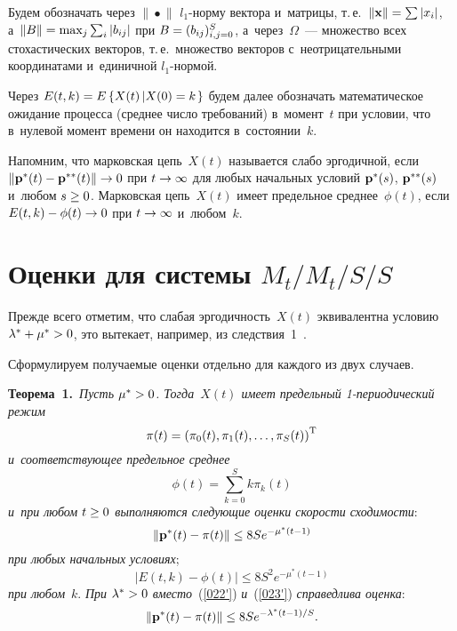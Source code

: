 \begin{multicols}{2}
Будем обозначать  через $\|\!\bullet\!\|$   $l_1$-нор\-му вектора 
и~мат\-ри\-цы, т.\,е.\  $\|{\bf x}\|\hm=\sum|x_i|$, 
а~$\|B\| \hm= \max\nolimits_j \sum\nolimits_i
|b_{ij}|$ при $B\hm = (b_{ij})_{i,j=0}^{S}$, а~через~$\Omega$~---
множество всех стохастических векторов, т.\,е.\ множество векторов 
с~неотрицательными координатами и~единичной $l_1$-нормой.


Через $E(t,k) = E\left\{X(t)\left\vert X(0)\hm=k\right.\right\}$ будем далее
обозначать математическое ожидание процесса (среднее число
требований) в~момент~$t$ при условии, что в~нулевой момент времени
он находится в~состоянии~$k$.

Напомним, что марковская цепь~$X(t)$ называется слабо эргодичной,
если $\| {\bf p^*}(t) \hm- {\bf p^{**}}(t) \| \hm\to 0 $ при $t\hm \to
\infty$ для любых начальных условий  ${\bf p^*}(s)$, ${\bf p^{**}}(s)$
и~любом $ s \hm\ge 0$. Марковская цепь~$X(t)$ имеет предельное среднее~$\phi (t)$, 
если $E(t,k) \hm- \phi (t) \hm\to 0$ при $t \hm\to \infty$ и~любом~$k$.

\section{Оценки для системы $M_t/M_t/S/S$}

Прежде всего отметим, что слабая эргодичность~$X(t)$ эквивалентна
условию $\la^*\hm+\mu^* \hm> 0$, это вытекает, например, из следствия~1~\cite{zAT}.

Сформулируем получаемые оценки отдельно для каждого из двух случаев.

\noindent
\textbf{Теорема~1.}\
\textit{Пусть $\mu^* \hm> 0$. Тогда~$X(t)$ имеет предельный 1-пе\-рио\-ди\-че\-ский
режим  
$$
{\bf \pi}(t) =\left(\pi_0(t),\pi_1(t),\dots,\pi_S(t)\right)^\mathrm{T} 
$$ 
и~соответствующее предельное среднее 
$$
\phi(t)= \sum\limits_{k=0}^Sk\pi_k(t)
$$
 и~при любом $t \hm\ge 0$ выполняются следующие оценки скорости схо\-ди\-мости}:
\begin{equation}
\|{\bf p}^*(t) - {\bf \pi}(t)\| \le 8S e^{-\mu^* (t-1)}
 \label{022'}
\end{equation}
\textit{при любых начальных условиях};
\begin{equation}
|E(t,k) - \phi (t)|  \le 8S^2e^{-\mu^* (t-1)}
 \label{023'}
\end{equation}
\textit{при любом}~$k$.
\textit{ При $\lambda^* \hm> 0$ вместо}~(\ref{022'}) \textit{и}~(\ref{023'}) 
\textit{справедлива оценка}:
\begin{equation}
\|{\bf p^*}(t) - {\bf \pi}(t)\| \le    8S
e^{-{\lambda^*(t-1)}/{S}}. \label{053}
\end{equation}



\end{multicols}
